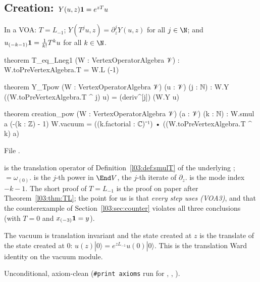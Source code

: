 \subsection{Creation: \texorpdfstring{$Y(u,z)\mathbf{1} = e^{zT}u$}{Y(u,z)1 = exp(zT)u}}

\begin{theorem}\label{l03:thm:creation}
In a VOA: $T = L_{-1}$; $Y(T^ju,z) = \partial_z^jY(u,z)$ for all $j\in\N$; and
$u_{(-k-1)}\mathbf{1} = \frac1{k!}T^ku$ for all $k\in\N$.
\end{theorem}
\begin{leancode}
theorem T_eq_Lneg1 (W : VertexOperatorAlgebra 𝒱) : W.toPreVertexAlgebra.T = W.L (-1)

theorem Y_Tpow (W : VertexOperatorAlgebra 𝒱) (u : 𝒱) (j : ℕ) :
    W.Y ((W.toPreVertexAlgebra.T ^ j) u) = (deriv^[j]) (W.Y u)

theorem creation_pow (W : VertexOperatorAlgebra 𝒱) (a : 𝒱) (k : ℕ) :
    W.smul a (-(k : ℤ) - 1) W.vacuum
      = ((k.factorial : ℂ)⁻¹) • ((W.toPreVertexAlgebra.T ^ k) a)
\end{leancode}
File .

\begin{dictionary}
 is the translation operator of Definition~\ref{l03:def:smulT} of the
underlying ;  $=\omega_{(0)}$.  is the $j$-th power in
$\End V$,  the $j$-th iterate of $\partial_z$.  is the mode
index $-k-1$. The short proof of $T = L_{-1}$ is the proof on paper after Theorem~\ref{l03:thm:TL}; the point for us is that \emph{every step
uses (VOA3)}, and that the counterexample of Section~\ref{l03:sec:counter} violates all three
conclusions (with $T = 0$ and $x_{(-3)}\mathbf{1} = y$).
\end{dictionary}

\begin{physics}
The vacuum is translation invariant and the state created at $z$ is the translate of the state
created at $0$: $u(z)|0\rangle = e^{zL_{-1}}u(0)|0\rangle$. This is the translation Ward identity on
the vacuum module.
\end{physics}

\begin{status}
Unconditional, axiom-clean (\texttt{\#print axioms} run for ,
, ).
\end{status}

